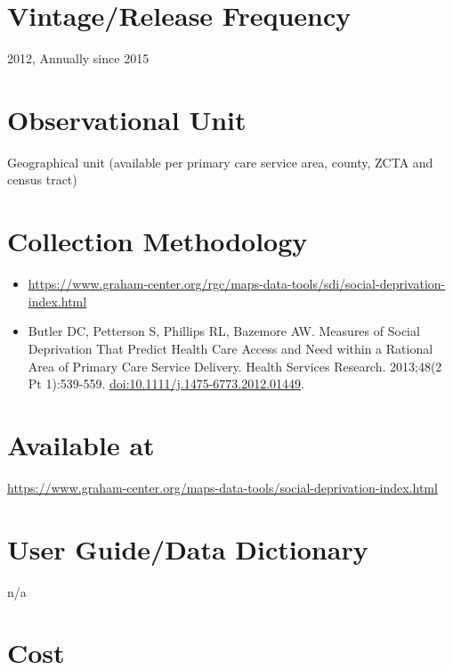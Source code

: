 \documentclass[
]{book}
\providecommand{\tightlist}{%
  \setlength{\itemsep}{0pt}\setlength{\parskip}{0pt}}
\begin{document}
\hypertarget{vintagerelease-frequency-80}{%
\section{Vintage/Release Frequency}\label{vintagerelease-frequency-80}}

2012, Annually since 2015

\hypertarget{observational-unit-80}{%
\section{Observational Unit}\label{observational-unit-80}}

Geographical unit (available per primary care service area, county, ZCTA and census tract)

\hypertarget{collection-methodology-80}{%
\section{Collection Methodology}\label{collection-methodology-80}}

\begin{itemize}
\tightlist
\item
  \url{https://www.graham-center.org/rgc/maps-data-tools/sdi/social-deprivation-index.html}
\item
  Butler DC, Petterson S, Phillips RL, Bazemore AW. Measures of Social Deprivation That Predict Health Care Access and Need within a Rational Area of Primary Care Service Delivery. Health Services Research. 2013;48(2 Pt 1):539-559. \url{doi:10.1111/j.1475-6773.2012.01449}.
\end{itemize}

\hypertarget{available-at-80}{%
\section{Available at}\label{available-at-80}}

\url{https://www.graham-center.org/maps-data-tools/social-deprivation-index.html}

\hypertarget{user-guidedata-dictionary-80}{%
\section{User Guide/Data Dictionary}\label{user-guidedata-dictionary-80}}

n/a

\hypertarget{cost-80}{%
\section{Cost}\label{cost-80}}
\end{document}
